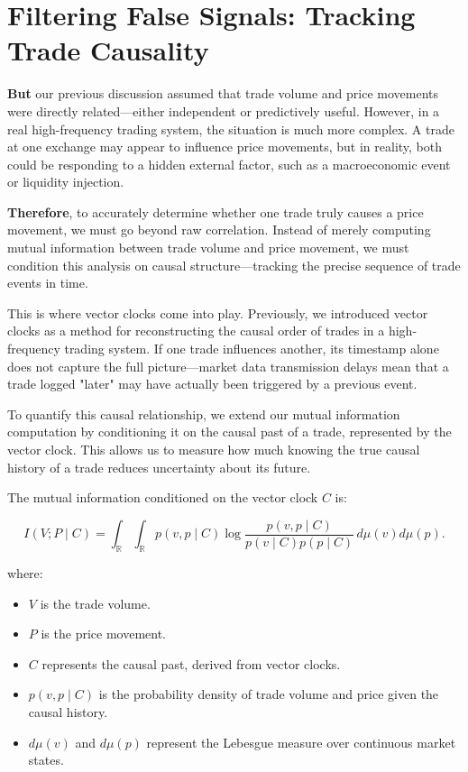 \section{Filtering False Signals: Tracking Trade Causality}

\textbf{But} our previous discussion assumed that trade volume and price movements were directly related—either independent or predictively useful. However, in a real high-frequency trading system, the situation is much more complex. A trade at one exchange may appear to influence price movements, but in reality, both could be responding to a hidden external factor, such as a macroeconomic event or liquidity injection.

\textbf{Therefore}, to accurately determine whether one trade truly causes a price movement, we must go beyond raw correlation. Instead of merely computing mutual information between trade volume and price movement, we must condition this analysis on causal structure—tracking the precise sequence of trade events in time. 

This is where vector clocks come into play. Previously, we introduced vector clocks as a method for reconstructing the causal order of trades in a high-frequency trading system. If one trade influences another, its timestamp alone does not capture the full picture—market data transmission delays mean that a trade logged "later" may have actually been triggered by a previous event.

To quantify this causal relationship, we extend our mutual information computation by conditioning it on the causal past of a trade, represented by the vector clock. This allows us to measure how much knowing the true causal history of a trade reduces uncertainty about its future.

The mutual information conditioned on the vector clock \(C\) is:

\[
I(V; P \mid C) = \int_{\mathbb{R}} \int_{\mathbb{R}} p(v, p \mid C) \log \frac{p(v, p \mid C)}{p(v \mid C) p(p \mid C)} \, d\mu(v) d\mu(p).
\]

where:
\begin{itemize}
    \item \(V\) is the trade volume.
    \item \(P\) is the price movement.
    \item \(C\) represents the causal past, derived from vector clocks.
    \item \(p(v, p \mid C)\) is the probability density of trade volume and price given the causal history.
    \item \(d\mu(v)\) and \(d\mu(p)\) represent the Lebesgue measure over continuous market states.
\end{itemize}

